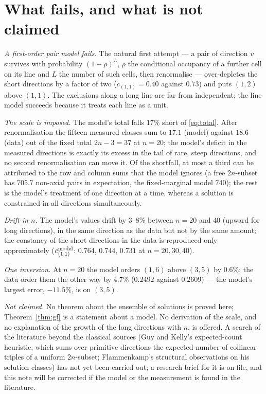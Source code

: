 \documentclass[11pt,a4paper]{article}
\begin{document}
\section{What fails, and what is not claimed}
\emph{A first-order pair model fails.}  The natural first attempt --- a pair of direction $v$ survives with probability
$(1-\rho)^{L}$, $\rho$ the conditional occupancy of a further cell on its line and $L$ the number of such cells, then
renormalise --- over-depletes the short directions by a factor of two ($c_{(1,1)}=0.40$ against $0.73$) and puts $(1,2)$
above $(1,1)$.  The exclusions along a long line are far from independent; the line model succeeds because it treats
each line as a unit.

\emph{The scale is imposed.}  The model's total falls $17\%$ short of \eqref{eq:total}.  After renormalisation the
fifteen measured classes sum to $17.1$ (model) against $18.6$ (data) out of the fixed total $2n-3=37$ at $n=20$; the
model's deficit in the measured directions is exactly its excess in the tail of rare, steep directions, and no second
renormalisation can move it.  Of the shortfall, at most a third can be attributed to the row and column sums that the
model ignores (a free $2n$-subset has $705.7$ non-axial pairs in expectation, the fixed-marginal model $740$);
the rest is the model's treatment of one direction at a time, whereas a solution is constrained in all directions
simultaneously.

\emph{Drift in $n$.}  The model's values drift by $3$--$8\%$ between $n=20$ and $40$ (upward for long directions),
in the same direction as the data but not by the same amount; the constancy of the short directions in the data is
reproduced only approximately ($c^{\rm model}_{(1,1)}$: $0.764$, $0.744$, $0.731$ at $n=20,30,40$).

\emph{One inversion.}  At $n=20$ the model orders $(1,6)$ above $(3,5)$ by $0.6\%$; the data order them the other way by
$4.7\%$ ($0.2492$ against $0.2609$) --- the model's largest error, $-11.5\%$, is on $(3,5)$.

\emph{Not claimed.}  No theorem about the ensemble of solutions is proved here; Theorem~\ref{thm:gf} is a statement
about a model.  No derivation of the scale, and no explanation of the growth of the long directions with $n$, is
offered.  A search of the literature beyond the classical sources (Guy and Kelly's expected-count heuristic, which
sums over primitive directions the expected number of collinear triples of a uniform $2n$-subset; Flammenkamp's
structural observations on his solution classes) has not yet been carried out; a research brief for it is on file,
and this note will be corrected if the model or the measurement is found in the literature.
\end{document}
